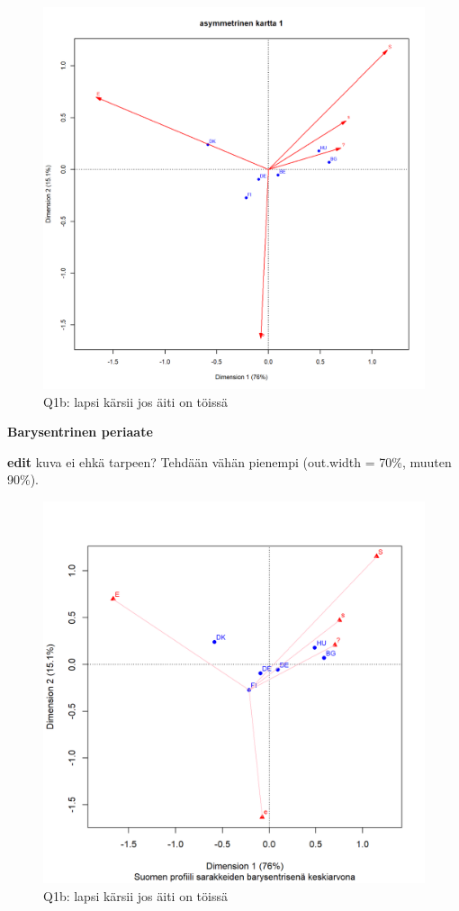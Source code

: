 \documentclass[
  finnish,
]{book}
\begin{document}
\begin{figure}

{\centering \includegraphics[width=0.9\linewidth]{JH_capaper_files/figure-latex/G1-3asymm2-1} 

}

\caption{Q1b: lapsi kärsii jos äiti on töissä}\label{fig:G1-3asymm2}
\end{figure}

\textbf{Barysentrinen periaate}

\textbf{edit} kuva ei ehkä tarpeen? Tehdään vähän pienempi (out.width =
70\%, muuten 90\%).

\begin{figure}

{\centering \includegraphics[width=0.7\linewidth]{JH_capaper_files/figure-latex/G1-3asymm3-1} 

}

\caption{Q1b: lapsi kärsii jos äiti on töissä}\label{fig:G1-3asymm3}
\end{figure}
\end{document}
